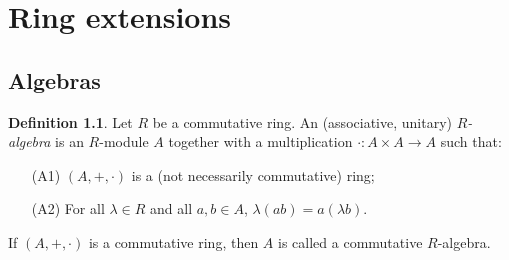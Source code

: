\documentclass[12pt,a4paper]{report}
\theoremstyle{definition}
\newtheorem{defn}[theorem]{Definition}
\theoremstyle{num.custom-title}
\begin{document}
\chapter{Ring extensions}

\section{Algebras}

\begin{defn}
Let $R$ be a commutative ring. An (associative, unitary) $R$\emph{-algebra} is an $R$-module $A$ together with a multiplication $\cdot : A \times A \to A$ such that:
\begin{itemize}
\item[(A1)] $(A,+,\cdot)$ is a (not necessarily commutative) ring;
\item[(A2)] For all $\lambda \in R$ and all $a,b \in A$, $\lambda (ab) = a (\lambda b)$.
\end{itemize}
If $(A,+,\cdot)$ is a commutative ring, then $A$ is called a commutative $R$-algebra.
\end{defn}
\end{document}
